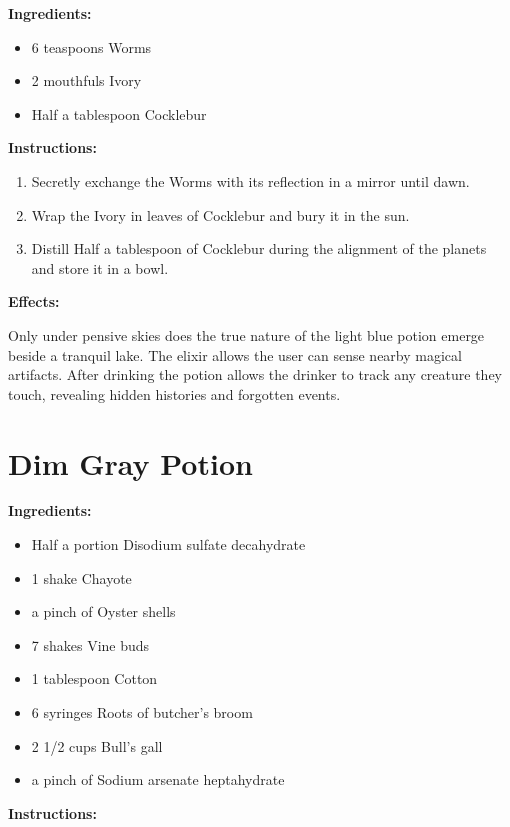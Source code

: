 \documentclass{article}
\begin{document}
\textbf{Ingredients:}

\begin{itemize}
  \item 6 teaspoons Worms
  \item 2 mouthfuls Ivory
  \item Half a tablespoon Cocklebur
\end{itemize}

\textbf{Instructions:}

\begin{enumerate}
  \item Secretly exchange the Worms with its reflection in a mirror until dawn.
  \item Wrap the Ivory in leaves of Cocklebur and bury it in the sun.
  \item Distill Half a tablespoon of Cocklebur during the alignment of the planets and store it in a bowl.
\end{enumerate}

\textbf{Effects:}

Only under pensive skies does the true nature of the light blue potion emerge beside a tranquil lake. The elixir allows the user can sense nearby magical artifacts. After drinking the potion allows the drinker to track any creature they touch, revealing hidden histories and forgotten events.

\newpage
\section*{Dim Gray Potion}

\textbf{Ingredients:}

\begin{itemize}
  \item Half a portion Disodium sulfate decahydrate
  \item 1 shake Chayote
  \item a pinch of Oyster shells
  \item 7 shakes Vine buds
  \item 1 tablespoon Cotton
  \item 6 syringes Roots of butcher's broom
  \item 2 1/2 cups Bull's gall
  \item a pinch of Sodium arsenate heptahydrate
\end{itemize}

\textbf{Instructions:}
\end{document}
